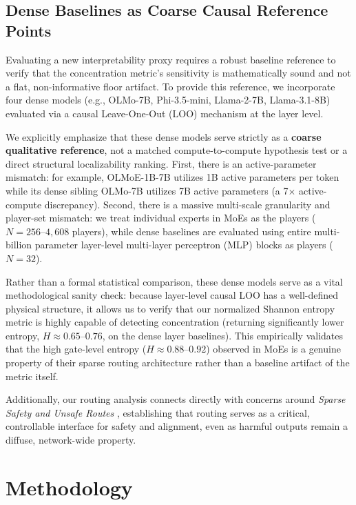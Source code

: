 \documentclass[11pt,a4paper]{article}
\begin{document}
\subsection{Dense Baselines as Coarse Causal Reference Points}
Evaluating a new interpretability proxy requires a robust baseline reference to verify that the concentration metric's sensitivity is mathematically sound and not a flat, non-informative floor artifact. To provide this reference, we incorporate four dense models (e.g., OLMo-7B, Phi-3.5-mini, Llama-2-7B, Llama-3.1-8B) evaluated via a causal Leave-One-Out (LOO) mechanism at the layer level. 

We explicitly emphasize that these dense models serve strictly as a \textbf{coarse qualitative reference}, not a matched compute-to-compute hypothesis test or a direct structural localizability ranking. First, there is an active-parameter mismatch: for example, OLMoE-1B-7B utilizes 1B active parameters per token while its dense sibling OLMo-7B utilizes 7B active parameters (a 7$\times$ active-compute discrepancy). Second, there is a massive multi-scale granularity and player-set mismatch: we treat individual experts in MoEs as the players ($N = 256\text{--}4,608$ players), while dense baselines are evaluated using entire multi-billion parameter layer-level multi-layer perceptron (MLP) blocks as players ($N = 32$). 

Rather than a formal statistical comparison, these dense models serve as a vital methodological sanity check: because layer-level causal LOO has a well-defined physical structure, it allows us to verify that our normalized Shannon entropy metric is highly capable of detecting concentration (returning significantly lower entropy, $H \approx 0.65\text{--}0.76$, on the dense layer baselines). This empirically validates that the high gate-level entropy ($H \approx 0.88\text{--}0.92$) observed in MoEs is a genuine property of their sparse routing architecture rather than a baseline artifact of the metric itself.

Additionally, our routing analysis connects directly with concerns around \textit{Sparse Safety and Unsafe Routes} \cite{sparse_safety_unsafe}, establishing that routing serves as a critical, controllable interface for safety and alignment, even as harmful outputs remain a diffuse, network-wide property.

\section{Methodology}
\end{document}
